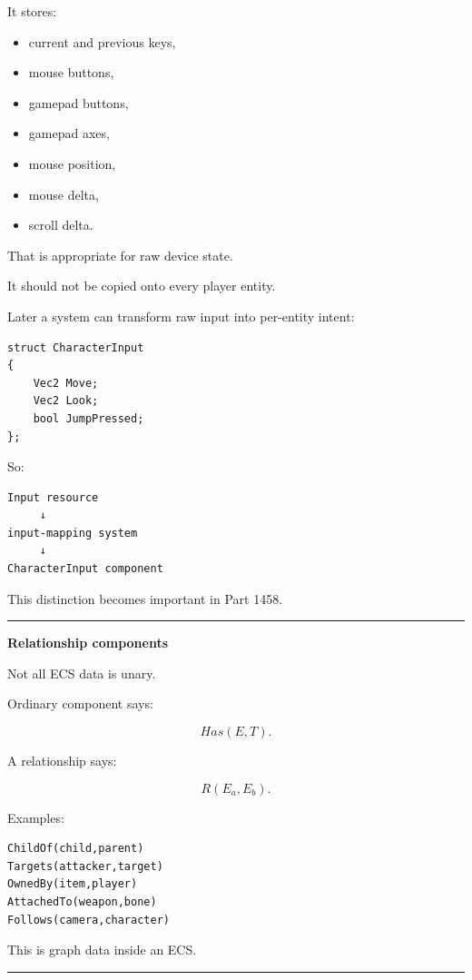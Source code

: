 It stores:

\begin{itemize}
\tightlist
\item
  current and previous keys,
\item
  mouse buttons,
\item
  gamepad buttons,
\item
  gamepad axes,
\item
  mouse position,
\item
  mouse delta,
\item
  scroll delta.
\end{itemize}

That is appropriate for raw device state.

It should not be copied onto every player entity.

Later a system can transform raw input into per-entity intent:

\begin{verbatim}
struct CharacterInput
{
    Vec2 Move;
    Vec2 Look;
    bool JumpPressed;
};
\end{verbatim}

So:

\begin{verbatim}
Input resource
     ↓
input-mapping system
     ↓
CharacterInput component
\end{verbatim}

This distinction becomes important in Part 1458.

\begin{center}\rule{0.5\linewidth}{0.5pt}\end{center}

\textbf{Relationship components}

Not all ECS data is unary.

Ordinary component says:

\[
Has(E,T).
\]

A relationship says:

\[
R(E_a,E_b).
\]

Examples:

\begin{verbatim}
ChildOf(child,parent)
Targets(attacker,target)
OwnedBy(item,player)
AttachedTo(weapon,bone)
Follows(camera,character)
\end{verbatim}

This is graph data inside an ECS.

\begin{center}\rule{0.5\linewidth}{0.5pt}\end{center}

